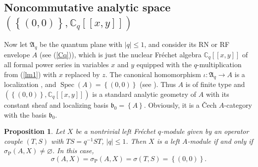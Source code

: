 \documentclass[12pt]{amsart}%
\theoremstyle{plain}
\newtheorem{proposition}{Proposition}
\numberwithin{equation}{section}
\numberwithin{equation}{section}
\numberwithin{theorem}{section}
\numberwithin{lemma}{section}
\numberwithin{remark}{section}
\numberwithin{example}{section}
\numberwithin{proposition}{section}
\numberwithin{definition}{section}
\numberwithin{corollary}{section}
\begin{document}
\subsection{Noncommutative analytic space $\left(  \left\{  \left(
0,0\right)  \right\}  ,\mathbb{C}_{q}\left[  \left[  x,y\right]  \right]
\right)  $}

Now let $\mathfrak{A}_{q}$ be the quantum plane with $\left\vert q\right\vert
\leq1$, and consider its RN or RF envelope $A$ (see (\ref{Cq})), which is just
the nuclear Fr\'{e}chet algebra $\mathbb{C}_{q}\left[  \left[  x,y\right]
\right]  $ of all formal power series in variables $x$ and $y$ equipped with
the $q$-multiplication from (\ref{lm1}) with $x$ replaced by $z$. The
canonical homomorphism $\iota:\mathfrak{A}_{q}\rightarrow A$ is a localization
\cite{DosiLoc}, and $\operatorname{Spec}\left(  A\right)  =\left\{  \left(
0,0\right)  \right\}  $ (see \cite[Lemma 5.1]{Dosi25}). Thus $A$ is of finite
type and $\left(  \left\{  \left(  0,0\right)  \right\}  ,\mathbb{C}%
_{q}\left[  \left[  x,y\right]  \right]  \right)  $ is a standard analytic
geometry of $A$ with its constant sheaf and localizing basis $\mathfrak{b}%
_{0}=\left\{  A\right\}  $. Obviously, it is a \v{C}ech $A$-category with the
basis $\mathfrak{b}_{0}$.

\begin{proposition}
\label{propCex3}Let $X$ be a nontrivial left Fr\'{e}chet $q$-module given by
an operator couple $\left(  T,S\right)  $ with $TS=q^{-1}ST$, $\left\vert
q\right\vert \leq1$. Then $X$ is a left $A$-module if and only if
$\sigma_{\operatorname{P}}\left(  A,X\right)  \neq\varnothing$. In this case,%
\[
\sigma\left(  A,X\right)  =\sigma_{\operatorname{P}}\left(  A,X\right)
=\sigma\left(  T,S\right)  =\left\{  \left(  0,0\right)  \right\}  .
\]

\end{proposition}
\end{document}
